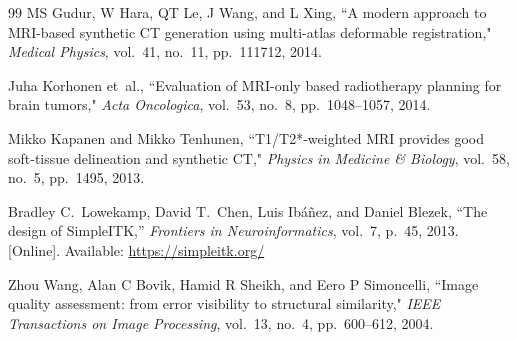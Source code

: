 \begin{thebibliography}{99}
MS Gudur, W Hara, QT Le, J Wang, and L Xing, ``A modern approach to MRI-based synthetic CT generation using multi-atlas deformable registration," \emph{Medical Physics}, vol.~41, no.~11, pp.~111712, 2014.

Juha Korhonen et~al., ``Evaluation of MRI-only based radiotherapy planning for brain tumors," \emph{Acta Oncologica}, vol.~53, no.~8, pp.~1048--1057, 2014.

Mikko Kapanen and Mikko Tenhunen, ``T1/T2*-weighted MRI provides good soft-tissue delineation and synthetic CT," \emph{Physics in Medicine \& Biology}, vol.~58, no.~5, pp.~1495, 2013.

Bradley C.~Lowekamp, David T.~Chen, Luis Ib{\'a}{\~n}ez, and Daniel Blezek, ``The design of SimpleITK,'' \emph{Frontiers in Neuroinformatics}, vol.~7, p.~45, 2013. [Online]. Available: \url{https://simpleitk.org/}

Zhou Wang, Alan C Bovik, Hamid R Sheikh, and Eero P Simoncelli, ``Image quality assessment: from error visibility to structural similarity," \emph{IEEE Transactions on Image Processing}, vol.~13, no.~4, pp.~600--612, 2004.

\end{thebibliography}
